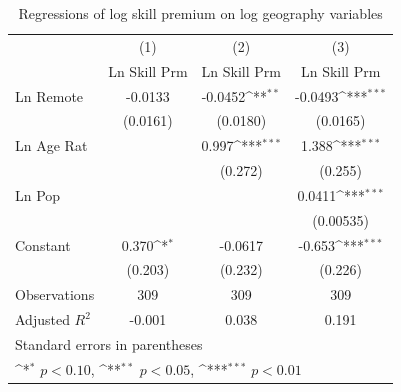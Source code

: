 \documentclass{article}
\begin{document}
\begin{table}
    \centering
    {
    \def\sym#1{\ifmmode^{#1}\else\(^{#1}\)\fi}
    \begin{tabular}{l*{3}{c}}
    \hline\hline
                        &\multicolumn{1}{c}{(1)}&\multicolumn{1}{c}{(2)}&\multicolumn{1}{c}{(3)}\\
                        &\multicolumn{1}{c}{Ln Skill Prm}&\multicolumn{1}{c}{Ln Skill Prm}&\multicolumn{1}{c}{Ln Skill Prm}\\
    \hline
    Ln Remote           &     -0.0133         &     -0.0452\sym{**} &     -0.0493\sym{***}\\
                        &    (0.0161)         &    (0.0180)         &    (0.0165)         \\
    [1em]
    Ln Age Rat          &                     &       0.997\sym{***}&       1.388\sym{***}\\
                        &                     &     (0.272)         &     (0.255)         \\
    [1em]
    Ln Pop              &                     &                     &      0.0411\sym{***}\\
                        &                     &                     &   (0.00535)         \\
    [1em]
    Constant            &       0.370\sym{*}  &     -0.0617         &      -0.653\sym{***}\\
                        &     (0.203)         &     (0.232)         &     (0.226)         \\
    \hline
    Observations        &         309         &         309         &         309         \\
    Adjusted \(R^{2}\)  &      -0.001         &       0.038         &       0.191         \\
    \hline\hline
    \multicolumn{4}{l}{\footnotesize Standard errors in parentheses}\\
    \multicolumn{4}{l}{\footnotesize \sym{*} \(p<0.10\), \sym{**} \(p<0.05\), \sym{***} \(p<0.01\)}\\
    \end{tabular}
    }
    \caption{Regressions of log skill premium on log geography variables}
    \label{tab:skill_reg}
\end{table}
\end{document}

